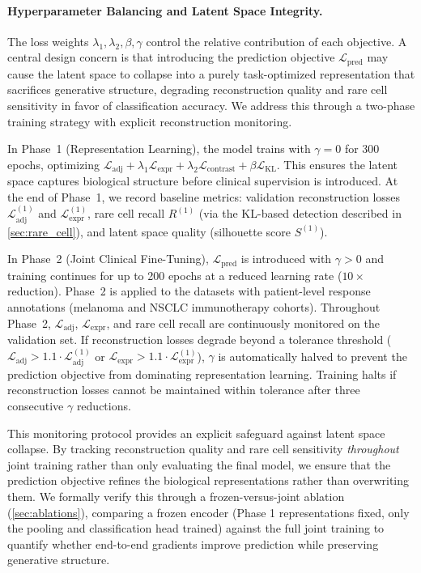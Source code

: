 \documentclass{article}
\newcommand{\KL}{\mathrm{KL}}
\begin{document}
\paragraph{Hyperparameter Balancing and Latent Space Integrity.} The loss weights $\lambda_1, \lambda_2, \beta, \gamma$ control the relative contribution of each objective. A central design concern is that introducing the prediction objective $\mathcal{L}_{\text{pred}}$ may cause the latent space to collapse into a purely task-optimized representation that sacrifices generative structure, degrading reconstruction quality and rare cell sensitivity in favor of classification accuracy. We address this through a two-phase training strategy with explicit reconstruction monitoring.

In Phase~1 (Representation Learning), the model trains with $\gamma = 0$ for 300 epochs, optimizing $\mathcal{L}_{\text{adj}} + \lambda_1 \mathcal{L}_{\text{expr}} + \lambda_2 \mathcal{L}_{\text{contrast}} + \beta \mathcal{L}_{\KL}$. This ensures the latent space captures biological structure before clinical supervision is introduced. At the end of Phase~1, we record baseline metrics: validation reconstruction losses $\mathcal{L}_{\text{adj}}^{(1)}$ and $\mathcal{L}_{\text{expr}}^{(1)}$, rare cell recall $R^{(1)}$ (via the KL-based detection described in \cref{sec:rare_cell}), and latent space quality (silhouette score $S^{(1)}$).

In Phase~2 (Joint Clinical Fine-Tuning), $\mathcal{L}_{\text{pred}}$ is introduced with $\gamma > 0$ and training continues for up to 200 epochs at a reduced learning rate ($10\times$ reduction). Phase~2 is applied to the datasets with patient-level response annotations (melanoma and NSCLC immunotherapy cohorts). Throughout Phase~2, $\mathcal{L}_{\text{adj}}$, $\mathcal{L}_{\text{expr}}$, and rare cell recall are continuously monitored on the validation set. If reconstruction losses degrade beyond a tolerance threshold ($\mathcal{L}_{\text{adj}} > 1.1 \cdot \mathcal{L}_{\text{adj}}^{(1)}$ or $\mathcal{L}_{\text{expr}} > 1.1 \cdot \mathcal{L}_{\text{expr}}^{(1)}$), $\gamma$ is automatically halved to prevent the prediction objective from dominating representation learning. Training halts if reconstruction losses cannot be maintained within tolerance after three consecutive $\gamma$ reductions.

This monitoring protocol provides an explicit safeguard against latent space collapse. By tracking reconstruction quality and rare cell sensitivity \textit{throughout} joint training rather than only evaluating the final model, we ensure that the prediction objective refines the biological representations rather than overwriting them. We formally verify this through a frozen-versus-joint ablation (\cref{sec:ablations}), comparing a frozen encoder (Phase 1 representations fixed, only the pooling and classification head trained) against the full joint training to quantify whether end-to-end gradients improve prediction while preserving generative structure.
\end{document}
